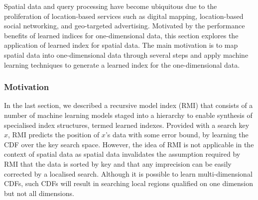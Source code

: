 Spatial data and query processing have become ubiquitous due to the proliferation of location-based services such as digital mapping, location-based social networking, and geo-targeted advertising. Motivated by the performance benefits of learned indices for one-dimensional data, this section explores the application of learned index for spatial data. The main motivation is to map spatial data into one-dimensional data through several steps and apply machine learning techniques to generate a learned index for the one-dimensional data.

\subsubsection{Motivation}

In the last section, we described a recursive model index (RMI) that consists of a number of machine learning models staged into a hierarchy to enable synthesis of specialised index structures, termed learned indexes. Provided with a search key $x$, RMI predicts the position of $x$'s data with some error bound, by learning the CDF over the key search space. However, the idea of RMI is not applicable in the context of spatial data as spatial data invalidates the assumption required by RMI that the data is sorted by key and that any imprecision can be easily corrected by a localised search. Although it is possible to learn multi-dimensional CDFs, such CDFs will result in searching local regions qualified on one dimension but not all dimensions.

